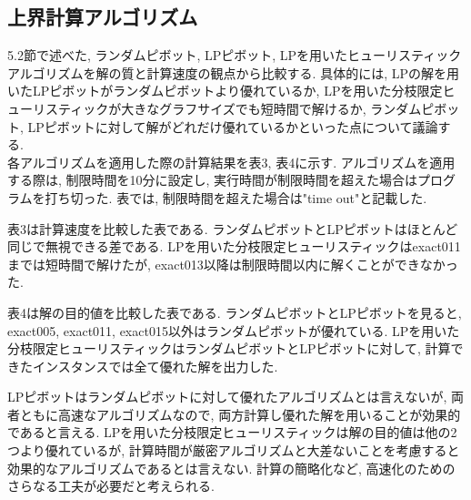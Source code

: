 \documentclass[10.5,a4paper,titlepage, dvipdfmx]{bxjsarticle}
\begin{document}
\subsection{上界計算アルゴリズム}
5.2節で述べた, ランダムピボット, LPピボット, LPを用いたヒューリスティックアルゴリズムを解の質と計算速度の観点から比較する.
具体的には, LPの解を用いたLPピボットがランダムピボットより優れているか, LPを用いた分枝限定ヒューリスティックが大きなグラフサイズでも短時間で解けるか, ランダムピボット, LPピボットに対して解がどれだけ優れているかといった点について議論する.\\
各アルゴリズムを適用した際の計算結果を表3, 表4に示す.
アルゴリズムを適用する際は, 制限時間を10分に設定し, 実行時間が制限時間を超えた場合はプログラムを打ち切った.
表では, 制限時間を超えた場合は"time out"と記載した. \par
表3は計算速度を比較した表である.
ランダムピボットとLPピボットはほとんど同じで無視できる差である.
LPを用いた分枝限定ヒューリスティックはexact011までは短時間で解けたが, exact013以降は制限時間以内に解くことができなかった.\par
表4は解の目的値を比較した表である.
ランダムピボットとLPピボットを見ると, exact005, exact011, exact015以外はランダムピボットが優れている.
LPを用いた分枝限定ヒューリスティックはランダムピボットとLPピボットに対して, 計算できたインスタンスでは全て優れた解を出力した.\par
LPピボットはランダムピボットに対して優れたアルゴリズムとは言えないが, 両者ともに高速なアルゴリズムなので, 両方計算し優れた解を用いることが効果的であると言える.
LPを用いた分枝限定ヒューリスティックは解の目的値は他の2つより優れているが, 計算時間が厳密アルゴリズムと大差ないことを考慮すると効果的なアルゴリズムであるとは言えない.
計算の簡略化など, 高速化のためのさらなる工夫が必要だと考えられる.
\end{document}

